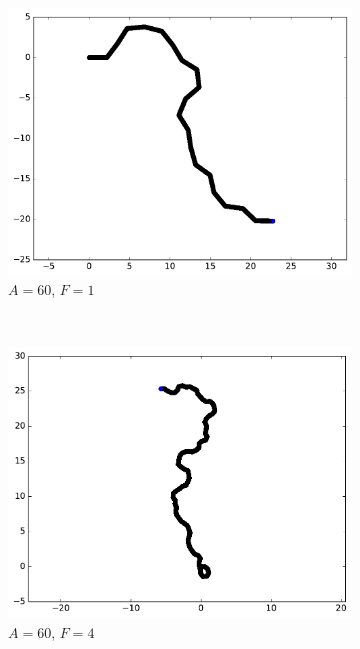 \begin{figure}[htb]
\begin{subfigure}[t]{\subImgWmo}
			\includegraphics[width=\textwidth]{figures/ch3/synTraj_219_60_1}
			\caption[$A = 60$, $F=1$]{$A = 60$, $F=1$}
			\label{fig:synTraj_219_60_1}
		\end{subfigure}
		~
		\begin{subfigure}[t]{\subImgWmo}
			\centering
			\includegraphics[width=\textwidth]{figures/ch3/synTraj_219_60_4}
			\caption[$A = 60$, $F=4$]{$A = 60$, $F=4$}
			\label{fig:synTraj_219_60_4}
		\end{subfigure}
		~
		\begin{subfigure}[t]{\subImgWmo}
			\centering

\end{subfigure}
\end{figure}
